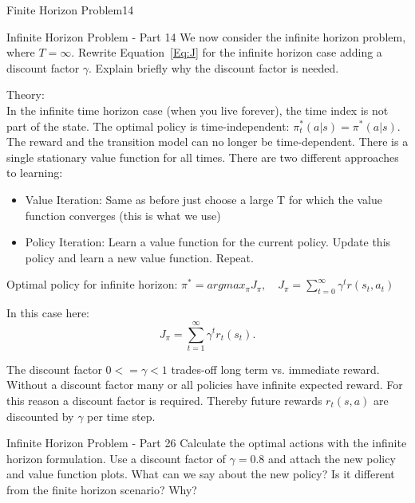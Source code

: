 \begin{questions}
\begin{question}{Finite Horizon Problem}{14}
\end{question}



\begin{question}{Infinite Horizon Problem - Part 1}{4}
We now consider the infinite horizon problem, where $T=\infty$. Rewrite Equation~\eqref{Eq:J} for the infinite horizon case adding a discount factor $\gamma$. Explain briefly why the discount factor is needed.

\begin{answer}
Theory: \\
In the infinite time horizon case (when you live forever), the time index is not part of the state.  The optimal policy is time-independent: $\pi_t^*(a|s)=\pi^*(a|s)$. The reward and the transition model can no longer be time-dependent. There is a single stationary value function for all times. There are two different approaches to learning:
\begin{itemize}
	\item Value Iteration: Same as before just choose a large T for which the value function converges (this is what we use)
	\item Policy Iteration: Learn a value function for the current policy. Update this policy and learn a new value function. Repeat.
\end{itemize}
Optimal policy for infinite horizon: $\pi^*=argmax_\pi J_\pi, \quad J_\pi=\sum_{t=0}^\infty \gamma^t r(s_t, a_t)$

In this case here:\\
\begin{equation}
J_\pi = \sum_{t=1}^{\infty} \gamma^t r_t(s_t).
\end{equation}

The discount factor $0<=\gamma<1$ trades-off long term vs. immediate reward. Without a discount factor many or all policies have infinite expected reward. For this reason a discount factor is required. Thereby future rewards $r_t(s,a)$ are discounted by $\gamma$ per time step.


	
\end{answer}

\end{question}



\begin{question}{Infinite Horizon Problem - Part 2}{6}
Calculate the optimal actions with the infinite horizon formulation. Use a discount factor of $\gamma=0.8$ and attach the new policy and value function plots.
What can we say about the new policy? Is it different from the finite horizon scenario? Why?


\end{question}
\end{questions}

